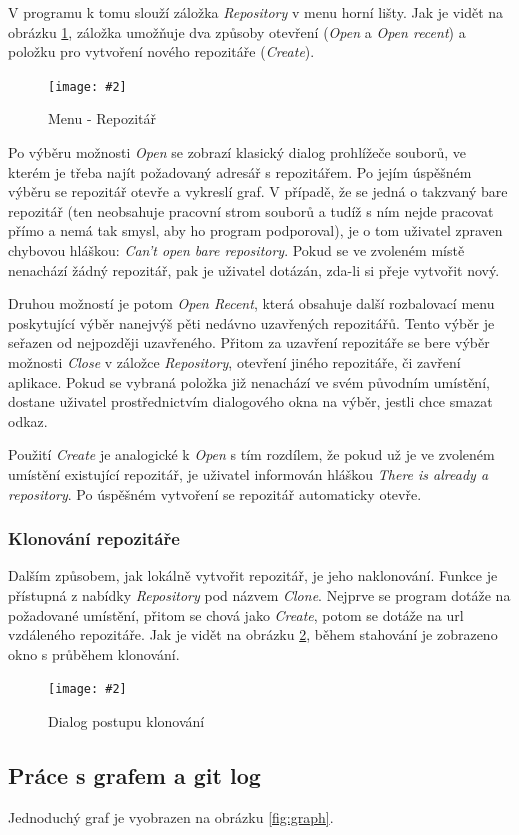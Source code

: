 \documentclass[
  biblatex,
  glossaries,
  index
]{kidiplom}
\newcommand{\pic}[4]{
\begin{figure}[h]
\centering
\texttt{[image: \#2]}
\caption{#3}
\label{fig:#4}
\end{figure}}
\begin{document}
V programu k tomu slouží záložka {\it Repository} v menu horní lišty. Jak je vidět na obrázku \ref{fig:menu-repository}, záložka umožňuje dva způsoby otevření ({\it Open} a {\it Open recent}) a položku pro vytvoření nového repozitáře ({\it Create}).

\pic{10cm}{Repository.png}{Menu - Repozitář}{menu-repository}

Po výběru možnosti {\it Open} se zobrazí klasický dialog prohlížeče souborů, ve kterém je třeba najít požadovaný adresář s repozitářem. Po jejím úspěšném výběru se repozitář otevře a vykreslí graf. V případě, že se jedná o takzvaný bare repozitář (ten neobsahuje pracovní strom souborů a tudíž s ním nejde pracovat přímo a nemá tak smysl, aby ho program podporoval), je o tom uživatel zpraven chybovou hláškou: {\it Can't open bare repository}. Pokud se ve zvoleném místě nenachází žádný repozitář, pak je uživatel dotázán, zda-li si přeje vytvořit nový.

Druhou možností je potom {\it Open Recent}, která obsahuje další rozbalovací menu poskytující výběr nanejvýš pěti nedávno uzavřených repozitářů. Tento výběr je seřazen od nejpozději uzavřeného. Přitom za uzavření repozitáře se bere výběr možnosti {\it Close} v záložce {\it Repository}, otevření jiného repozitáře, či zavření aplikace. Pokud se vybraná položka již nenachází ve svém původním umístění, dostane uživatel prostřednictvím dialogového okna na výběr, jestli chce smazat odkaz.

Použití {\it Create} je analogické k {\it Open} s tím rozdílem, že pokud už je ve zvoleném umístění existující repozitář, je uživatel informován hláškou {\it There is already a repository}. Po úspěšném vytvoření se repozitář automaticky otevře.

\subsubsection{Klonování repozitáře}
Dalším způsobem, jak lokálně vytvořit repozitář, je jeho naklonování. Funkce je přístupná z nabídky {\it Repository} pod názvem {\it Clone}. Nejprve se program dotáže na požadované umístění, přitom se chová jako {\it Create}, potom se dotáže na url vzdáleného repozitáře. Jak je vidět na obrázku \ref{fig:clone}, během stahování je zobrazeno okno s průběhem klonování.


\pic{10cm}{clonning.png}{Dialog postupu klonování}{clone}


\subsection{Práce s grafem a git log}
Jednoduchý graf je vyobrazen na obrázku \ref{fig:graph}.
\end{document}

